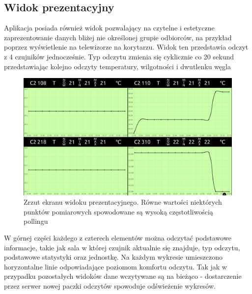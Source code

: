 \subsection{Widok prezentacyjny}
Aplikacja posiada również widok pozwalający na czytelne i estetyczne zaprezentowanie danych bliżej nie określonej grupie odbiorców, na przykład poprzez wyświetlenie
na telewizorze na korytarzu.
Widok ten przedstawia odczyt z 4 czujników jednocześnie. Typ odczytu zmienia się cyklicznie co 20 sekund przedstawiając kolejno odczyty temperatury, wilgotności
i dwutlenku węgla

\begin{figure}[H]
    \includegraphics[width=\textwidth]{zdj/app/presentation-view.png}
    \caption{Zrzut ekranu widoku prezentacyjnego. Równe wartości niektórych punktów pomiarowych spowodowane
    są wysoką częstotliwością pollingu}
\end{figure}

W górnej części każdego z czterech elementów można odczytać podstawowe informacje, takie jak sala w której czujnik aktualnie się znajduje, typ odczytu, podstawowe
statystyki oraz jednostkę. Na każdym wykresie umieszczono horyzontalne linie odpowiadające poziomom komfortu odczytu. Tak jak w przypadku pozostałych widoków
dane wczytywane są na bieżąco - dostarczenie przez serwer nowej paczki odczytów spowoduje odświeżenie wykresów.